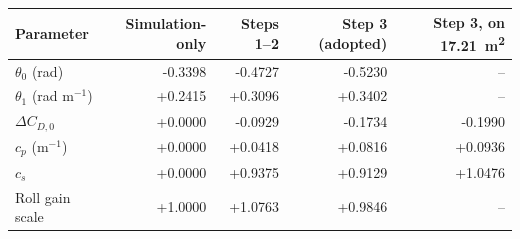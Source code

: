 \begin{tabular}{lrrrr}
\toprule
Parameter & Simulation-only & Steps 1--2 & Step 3 (adopted) & Step 3, on \SI{17.21}{\square\metre} \\
\midrule
$\theta_0$ (rad) & -0.3398 & -0.4727 & -0.5230 & -- \\
$\theta_1$ (rad m$^{-1}$) & +0.2415 & +0.3096 & +0.3402 & -- \\
$\Delta C_{D,0}$ & +0.0000 & -0.0929 & -0.1734 & -0.1990 \\
$c_p$ (m$^{-1}$) & +0.0000 & +0.0418 & +0.0816 & +0.0936 \\
$c_s$ & +0.0000 & +0.9375 & +0.9129 & +1.0476 \\
Roll gain scale & +1.0000 & +1.0763 & +0.9846 & -- \\
\bottomrule
\end{tabular}
